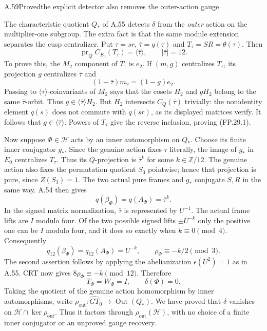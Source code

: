 \begin{statement}{A.59}{Proved}{the explicit detector also removes the outer-action gauge}
\end{statement}
The characteristic quotient $Q_*$ of A.55 detects $\delta$ from the
\emph{outer} action on the multiplier-one subgroup. The extra fact is
that the same module extension separates the cusp centralizer. Put
$\tau=sr$, $\bar\tau=q(\tau)$ and $T_\tau=SR=\theta(\tau)$.
Then
\[
 \operatorname{pr}_Q C_{E_0}(T_\tau)=\langle\bar\tau\rangle,
 \qquad |\bar\tau|=12.
 \tag{FP.29.1}
\]
To prove this, the $M_2$ component of $T_\tau$ is $e_2$.
If $(m,g)$ centralizes $T_\tau$, its projection $g$ centralizes
$\bar\tau$ and
\[
 (1-\bar\tau)m_2=(1-g)e_2.
\]
Passing to $\langle\bar\tau\rangle$-coinvariants of $M_2$ says that
the cosets $H_2$ and $gH_2$ belong to the same $\bar\tau$-orbit.
Thus $g\in\langle\bar\tau\rangle H_2$. But $H_2$ intersects
$C_Q(\bar\tau)$ trivially: the nonidentity element $q(s)$ does not
commute with $q(sr)$, as its displayed matrices verify. It follows
that $g\in\langle\bar\tau\rangle$. Powers of $T_\tau$ give the
reverse inclusion, proving (FP.29.1).

Now suppose $\Phi\in\mathcal H$ acts by an inner automorphism on
$Q_*$. Choose its finite inner conjugator $g_*$. Since the genuine
action fixes $\tau$ literally, the image of $g_*$ in $E_0$ centralizes
$T_\tau$. Thus its $Q$-projection is $\bar\tau^k$ for some
$k\in\mathbb Z/12$. The genuine action also fixes the permutation
quotient $S_3$ pointwise; hence that projection is pure, since
$Z(S_3)=1$. The two actual pure frames and $g_*$ conjugate $S,R$ in
the same way. A.54 then gives
\[
 q(\beta_\Phi)=q(A_\Phi)=\bar\tau^k.
\]
In the signed matrix normalization, $\bar\tau$ is represented by
$U^{-1}$. The actual frame lifts are $I$ modulo four. Of the two
possible signed lifts $\pm U^{-k}$ only the positive one can be $I$
modulo four, and it does so exactly when $k\equiv0\pmod4$.
Consequently
\[
 q_{12}(\beta_\Phi)=q_{12}(A_\Phi)=U^{-k},\qquad
 \rho_\Phi\equiv-k/2\pmod3.
\]
The second assertion follows by applying the abelianization
$\epsilon(U^2)=1$ as in A.55. CRT now gives
$8\rho_\Phi\equiv-k\pmod{12}$. Therefore
\[
 T_\Phi=W_\Phi=I,\qquad\delta(\Phi)=0.
 \tag{FP.29.2}
\]
Taking the quotient of the genuine action homomorphism by inner
automorphisms, write
$\rho_{\mathrm{out}}:\widehat{GT}_0\to\operatorname{Out}(Q_*)$.
We have proved that $\delta$ vanishes on
$\mathcal H\cap\ker\rho_{\mathrm{out}}$. Thus it factors through
$\rho_{\mathrm{out}}(\mathcal H)$, with no choice of a finite inner
conjugator or an unproved gauge recovery.

